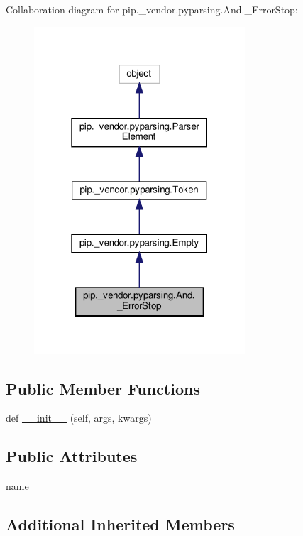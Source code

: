 Collaboration diagram for pip.\+\_\+vendor.\+pyparsing.\+And.\+\_\+\+Error\+Stop\+:
\nopagebreak
\begin{figure}[H]
\begin{center}
\leavevmode
\includegraphics[width=223pt]{classpip_1_1__vendor_1_1pyparsing_1_1And_1_1__ErrorStop__coll__graph}
\end{center}
\end{figure}
\subsection*{Public Member Functions}
\begin{DoxyCompactItemize}
\item 
def \hyperlink{classpip_1_1__vendor_1_1pyparsing_1_1And_1_1__ErrorStop_a0a23db4b6791dc7fcbe51e0907dcb547}{\+\_\+\+\_\+init\+\_\+\+\_\+} (self, args, kwargs)
\end{DoxyCompactItemize}
\subsection*{Public Attributes}
\begin{DoxyCompactItemize}
\item 
\hyperlink{classpip_1_1__vendor_1_1pyparsing_1_1And_1_1__ErrorStop_ade04f1905208a2607eca2f67882c8d07}{name}
\end{DoxyCompactItemize}
\subsection*{Additional Inherited Members}


